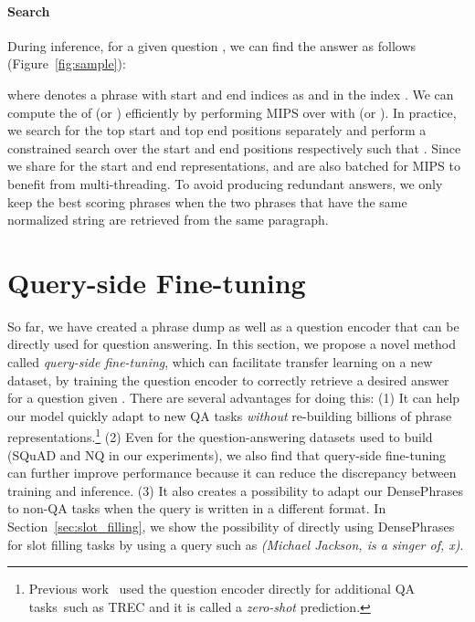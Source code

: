 \documentclass[11pt,a4paper]{article}
\newcommand{\ours}{DensePhrases}
\newcommand\ti[1]{\textit{#1}}
\begin{document}
\paragraph{Search}
During inference, for a given question , we can find the answer  as follows (Figure~\ref{fig:sample}):
\vspace{-0.5em}

\noindent where  denotes a phrase with start and end indices as  and  in the index .
We can compute the  of  (or ) efficiently by performing MIPS over  with  (or ).
In practice, we search for the top  start and top  end positions separately and perform a constrained search over the start and end positions respectively such that .
Since we share  for the start and end representations,  and  are also batched for MIPS to benefit from multi-threading.
To avoid producing redundant answers, we only keep the best scoring phrases when the two phrases that have the same normalized string are retrieved from the same paragraph.




\section{Query-side Fine-tuning}
\label{sec:qsft}

So far, we have created a phrase dump  as well as a question encoder  that can be directly used for question answering.
In this section, we propose a novel method called \ti{query-side fine-tuning}, which can facilitate {transfer learning} on a new dataset, by training the question encoder  to correctly retrieve a desired answer  for a question  given .
There are several advantages for doing this: (1) It can help our model quickly adapt to new QA tasks \ti{without} re-building billions of phrase representations.\footnote{Previous work~\cite{lee2020contextualized} used the question encoder  directly for additional QA tasks such as TREC and it is called a \ti{zero-shot} prediction. } (2) Even for the question-answering datasets used to build  (SQuAD and NQ in our experiments), we also find that query-side fine-tuning can further improve performance because it can reduce the discrepancy between training and inference. (3) It also creates a possibility to adapt our DensePhrases to non-QA tasks when the query is written in a different format. In Section~\ref{sec:slot_filling}, we show the possibility of directly using \ours~ for slot filling tasks by using a query such as \ti{(Michael Jackson, is a singer of, x)}.
\end{document}

